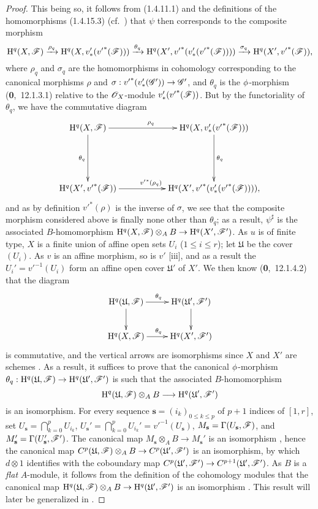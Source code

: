\begin{proof}
This being so, it follows from (1.4.11.1) and the definitions of the homomorphisms (1.4.15.3) (cf.~) that $\psi$ then corresponds to the composite morphism
\[
  \mathrm{H}^q(X,\mathscr{F})\xrightarrow{\rho_q}\mathrm{H}^q(X,v_*'({v'}^*(\mathscr{F})))\xrightarrow{\theta_q}\mathrm{H}^q(X',{v'}^*(v_*'({v'}^*(\mathscr{F}))))\xrightarrow{\sigma_q}\mathrm{H}^q(X',{v'}^*(\mathscr{F})),
\]
where $\rho_q$ and $\sigma_q$ are the homomorphisms in cohomology corresponding to the canonical morphisms $\rho$ and $\sigma:{v'}^*(v_*'(\sh{G}'))\to\sh{G}'$, and $\theta_q$ is the $\phi$-morphism (\textbf{0},~12.1.3.1) relative to the $\mathscr{O}_X$-module $v_*'({v'}^*(\mathscr{F}))$.
But by the functoriality of $\theta_q$, we have the commutative diagram
\[
  \xymatrix{
    \HH^q(X,\sh{F})\ar[rr]^{\rho_q}\ar[dd]_{\theta_q} & &
    \HH^q(X,v_*'({v'}^*(\sh{F})))\ar[dd]^{\theta_q}\\\\
    \HH^q(X',{v'}^*(\sh{F}))\ar[rr]^{{v'}^*(\rho_q)} & &
    \HH^q(X',{v'}^*(v_*'({v'}^*(\sh{F})))),
  }
\]
and as by definition  ${v'}^*(\rho)$ is the inverse of $\sigma$, we see that the composite morphism considered above is finally none other than $\theta_q$; as a result, $\psi^\sharp$ is the associated $B$-homomorphism $\HH^q(X,\sh{F})\otimes_A B\to\HH^q(X',\sh{F}')$.
As $u$ is of finite type, $X$ is a finite union of affine open sets $U_i$ ($1\leq i\leq r$); let $\mathfrak{U}$ be the cover $(U_i)$.
As $v$ is an affine morphism, so is $v'$ [iii], and as a result the $U_i'={v'}^{-1}(U_i)$ form an affine open cover $\mathfrak{U}'$ of $X'$.
We then know (\textbf{0},~12.1.4.2) that the diagram
\[
  \xymatrix{
    \HH^q(\mathfrak{U},\sh{F})\ar[r]^{\theta_q}\ar[d] &
    \HH^q(\mathfrak{U}',\sh{F}')\ar[d]\\
    \HH^q(X,\sh{F})\ar[r]^{\theta_q} &
    \HH^q(X',\sh{F}')
  }
\]
is commutative, and the vertical arrows are isomorphisms since $X$ and $X'$ are schemes .
As a result, it suffices to prove that the canonical $\phi$-morphism $\theta_q:\HH^q(\mathfrak{U},\sh{F})\to\HH^q(\mathfrak{U}',\sh{F}')$ is such that the associated $B$-homomorphism
\[
  \HH^q(\mathfrak{U},\sh{F})\otimes_A B\to\HH^q(\mathfrak{U}',\sh{F}')
\]
is an isomorphism.
For every sequence $\mathbf{s}=(i_k)_{0\leq k\leq p}$ of $p+1$ indices of $[1,r]$, set $U_\mathbf{s}=\bigcap_{k=0}^p U_{i_k}$, $U_\mathbf{s}'=\bigcap_{k=0}^p U_{i_k}'={v'}^{-1}(U_\mathbf{s})$, $M_\mathbf{s}=\Gamma(U_\mathbf{s},\mathscr{F})$, and $M_\mathbf{s}'=\Gamma(U_\mathbf{s}',\mathscr{F}')$.
The canonical map $M_\mathbf{s}\otimes_A B\to M_\mathbf{s}'$ is an isomorphism , hence the canonical map $C^p(\mathfrak{U},\sh{F})\otimes_A B\to C^p(\mathfrak{U}',\sh{F}')$ is an isomorphism, by which $d\otimes 1$ identifies with the coboundary map $C^p(\mathfrak{U}',\sh{F}')\to C^{p+1}(\mathfrak{U}',\sh{F}')$.
As $B$ is a \emph{flat} $A$-module, it follows from the definition of the cohomology modules that the canonical map $\HH^q(\mathfrak{U},\sh{F})\otimes_A B\to\HH^q(\mathfrak{U}',\sh{F}')$ is an isomorphism .
This result will later be generalized in .
\end{proof}

